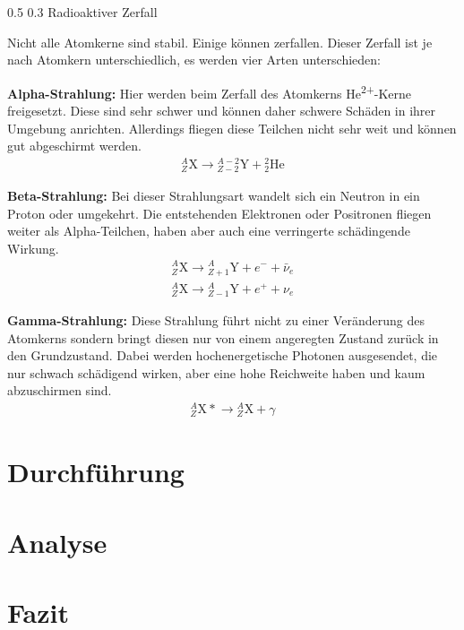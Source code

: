 \documentclass[german, %
parskip=full, %
bibliography=totoc, %
]{scrartcl}
\makeatletter
\renewcommand\subsection{\@startsection 
   {subsection}{2}{0mm}%
   {0.5\baselineskip}%
   {0.3\baselineskip}%
   {\bfseries\sffamily\large}%
   }
\makeatother
\begin{document}
\subsection{Radioaktiver Zerfall}

Nicht alle Atomkerne sind stabil. Einige können zerfallen. Dieser Zerfall ist je nach Atomkern unterschiedlich, es werden vier Arten unterschieden:

\textbf{Alpha-Strahlung:} Hier werden beim Zerfall des Atomkerns He\textsuperscript{2+}-Kerne freigesetzt. Diese sind sehr schwer und können daher schwere Schäden in ihrer Umgebung anrichten. Allerdings fliegen diese Teilchen nicht sehr weit und können gut abgeschirmt werden.
\begin{align}
{}^A_Z\mathrm{X} \to {}^{A-2}_{Z-2}\mathrm{Y} + {}^2_2\mathrm{He}
\end{align}

\textbf{Beta-Strahlung:} Bei dieser Strahlungsart wandelt sich ein Neutron in ein Proton oder umgekehrt. Die entstehenden Elektronen oder Positronen fliegen weiter als Alpha-Teilchen, haben aber auch eine verringerte schädingende Wirkung.
\begin{align}
{}^A_Z\mathrm{X} \to {}^{A}_{Z+1}\mathrm{Y} + e^- + \bar \nu_e \\
{}^A_Z\mathrm{X} \to {}^{A}_{Z-1}\mathrm{Y} + e^+ + \nu_e
\end{align}

\textbf{Gamma-Strahlung:} Diese Strahlung führt nicht zu einer Veränderung des Atomkerns sondern bringt diesen nur von einem angeregten Zustand zurück in den Grundzustand. Dabei werden hochenergetische Photonen ausgesendet, die nur schwach schädigend wirken, aber eine hohe Reichweite haben und kaum abzuschirmen sind.
\begin{align}
{}^A_Z\mathrm{X*} \to {}^{A}_{Z}\mathrm{X} + \gamma
\end{align}

\section{Durchführung}


\section{Analyse}


\section{Fazit}
\end{document}
